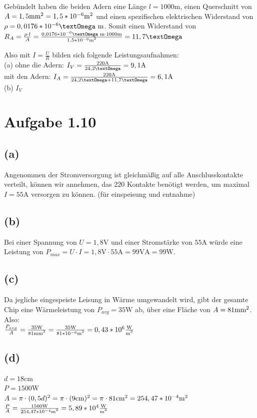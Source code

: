 \documentclass[]{article}
\newcommand{\unit}[1]{\text{#1}}
\newcommand{\fracunit}[2]{\frac{\unit{#1}}{\unit{#2}}}
\newcommand{\textsq}[1]{\ensuremath{\text{#1}^2}}
\begin{document}
	Gebündelt haben die beiden Adern eine Länge $l = 1000\unit{m}$, einen Querschnitt von $A = 1,5 \unit{\textsq{mm}} = 1,5 * 10^{-6} \unit{\textsq{m}}$ und einen spezifischen elektrischen Widerstand von $\rho = 0,0176 * 10^{-6}\unit{\textOmega m}$. Somit einen Widerstand von $ R_A = \frac{\rho \cdot l}{A} = \frac{0,0176 * 10^{-6}\unit{\textOmega m} \cdot 1000\unit{m}}{1,5 * 10^{-6} \unit{\textsq{m}}} = 11,7\unit{\textOmega}$

	Also mit $I = \frac{U}{R}$ bilden sich folgende Leistungsaufnahmen:\\
	(a) ohne die Adern: $I_V = \frac{220\unit{A}}{24,2\unit{\textOmega}} = 9,1\unit{A}$\\
	mit den Adern: $I_A = \frac{220\unit{A}}{24,2\unit{\textOmega} + 11,7\unit{\textOmega}} = 6,1\unit{A}$\\
	(b) $I_V$\\

\section*{Aufgabe 1.10}
\par
\subsection*{(a)}
	Angenommen der Stromversorgung ist gleichmäßig auf alle Anschlusskontakte verteilt, können wir annehmen, das $220$ Kontakte benötigt werden, um maximal $I = 55\unit{A}$ versorgen zu können. (für einspeisung und entnahme)
\subsection*{(b)}
	Bei einer Spannung von $U=1,8\unit{V}$ und einer Stromstärke von $55\unit{A}$ würde eine Leistung von $P_{max} = U \cdot I = 1,8\unit{V} \cdot 55\unit{A} = 99\unit{VA} = 99\unit{W}$.
\subsection*{(c)}
	Da jegliche eingespeiste Leisung in Wärme umgewandelt wird, gibt der gesamte Chip eine Wärmeleistung von $P_{avg}=35\unit{W}$ ab, über eine Fläche von $A = 81\unit{\textsq{mm}}$. Also:\\
	$\frac{P_{avg}}{A} = \frac{35\unit{W}}{81\unit{\textsq{mm}}} = \frac{35\unit{W}}{81*10^{-6}\unit{\textsq{m}}} = 0,43*10^{6} \fracunit{W}{\textsq{m}}$
\subsection*{(d)}
	$d = 18\unit{cm}$\\
	$P = 1500\unit{W}$\\
	$A = \pi\cdot (0,5d)^2 = \pi \cdot (9\unit{cm})^2 = \pi \cdot 81\unit{\textsq{cm}} = 254,47*10^{-4}\unit{\textsq{m}}$\\
	$\frac{P}{A} = \frac{1500\unit{W}}{254,47*10^{-4}\unit{\textsq{m}}} = 5,89*10^4 \fracunit{W}{\textsq{m}}$
\end{document}
